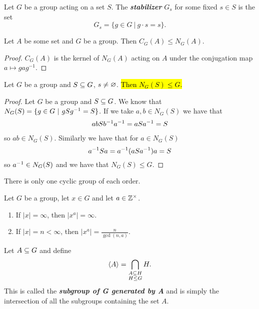 \begin{defn}
Let $G$ be a group acting on a set $S$. The \textit{\textbf{stabilizer}} $G_s$ for some fixed $s\in S$ is the set 
\[G_s = \{g\in G\ |\ g\cdot s = s\}.\]
\end{defn}

\begin{prop}
Let $A$ be some set and $G$ be a group. Then $C_G(A)\leq N_G(A)$.
\end{prop}
\begin{proof}
$C_G(A)$ is the kernel of $N_G(A)$ acting on $A$ under the conjugation map $a\mapsto gag^{-1}$.
\end{proof}

\nl

\begin{prop}
Let $G$ be a group and $S\subseteq G$, $s\neq \varnothing$. \hl{Then $N_G(S) \leq G$.}
\end{prop}

\begin{proof}
Let $G$ be a group and $S\subseteq G$. We know that $N_G(S) = \{g \in G\ |\ gSg^{-1} = S\}$. If we take $a, b\in N_G(S)$ we have that 
\begin{align*}
abSb^{-1} a^{-1} = aSa^{-1} = S
\end{align*}
so $ab \in N_G(S)$. Similarly we have that for $a\in N_G(S)$
\[a^{-1} Sa = a^{-1}(aSa^{-1})a = S\]
so $a^{-1} \in N_G(S)$ and we have that $N_G(S) \leq G$.
\end{proof}

\nl
\begin{thm}
There is only one cyclic group of each order.
\end{thm}

\nl
\begin{prop}
Let $G$ be a group, let $x\in G$ and let $a\in \mathbb{Z}^\times$.
\begin{enumerate}
\item If $|x|=\infty$, then $|x^a| = \infty$.
\item If $|x| = n< \infty$, then $|x^a| = \frac{n}{\gcd(n,a)}$.
\end{enumerate}
\end{prop}

\nl
\begin{defn}
Let $A\subseteq G$ and define 
\[\langle A\rangle = \bigcap_{\substack{ A\subseteq H\\H\leq G}} H. \]
This is called the \textit{\textbf{subgroup of G generated by A}} and is simply the intersection of all the subgroups containing the set $A$.
\end{defn}


